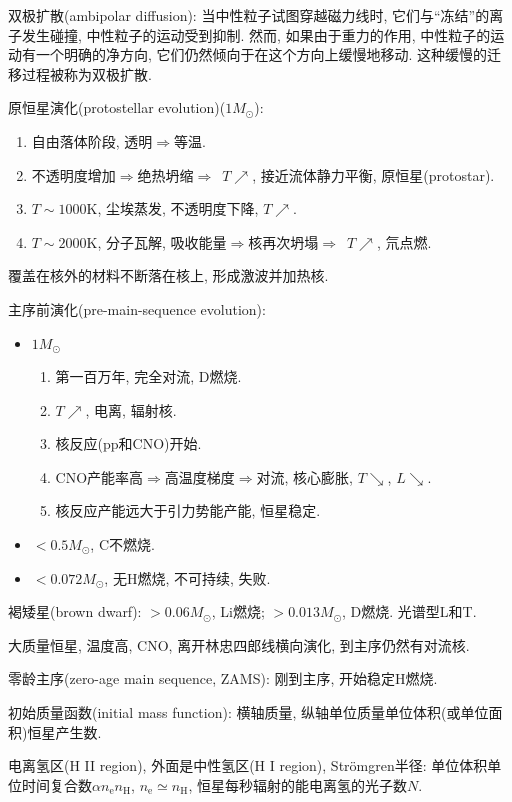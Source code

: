 双极扩散(ambipolar diffusion): 当中性粒子试图穿越磁力线时, 它们与``冻结''的离子发生碰撞, 中性粒子的运动受到抑制. 然而, 如果由于重力的作用, 中性粒子的运动有一个明确的净方向, 它们仍然倾向于在这个方向上缓慢地移动. 这种缓慢的迁移过程被称为双极扩散.

原恒星演化(protostellar evolution)($1M_\odot$): 
\begin{enumerate}
    \item 自由落体阶段, 透明$\Longrightarrow$等温.
    \item 不透明度增加$\Longrightarrow$绝热坍缩$\Longrightarrow$~$T\nearrow$, 接近流体静力平衡, 原恒星(protostar).
    \item $T\sim1000\text{K}$, 尘埃蒸发, 不透明度下降, $T\nearrow$.
    \item $T\sim2000\text{K}$, 分子瓦解, 吸收能量$\Longrightarrow$核再次坍塌$\Longrightarrow$~$T\nearrow$, 氘点燃.
\end{enumerate}
覆盖在核外的材料不断落在核上, 形成激波并加热核.

主序前演化(pre-main-sequence evolution):
\begin{itemize}
    \item $1M_\odot$\begin{enumerate}
        \item 第一百万年, 完全对流, D燃烧.
        \item $T\nearrow$, 电离, 辐射核.
        \item 核反应(pp和CNO)开始.
        \item CNO产能率高$\Longrightarrow$高温度梯度$\Longrightarrow$对流, 核心膨胀, $T\searrow$, $L\searrow$.
        \item 核反应产能远大于引力势能产能, 恒星稳定.
    \end{enumerate}
    \item $<0.5M_\odot$, C不燃烧.
    \item $<0.072M_\odot$, 无H燃烧, 不可持续, 失败.
\end{itemize}
褐矮星(brown dwarf): $>0.06M_\odot$, Li燃烧; $>0.013M_\odot$, D燃烧. 光谱型L和T.

大质量恒星, 温度高, CNO, 离开林忠四郎线横向演化, 到主序仍然有对流核.

零龄主序(zero-age main sequence, ZAMS): 刚到主序, 开始稳定H燃烧.

初始质量函数(initial mass function): 横轴质量, 纵轴单位质量单位体积(或单位面积)恒星产生数.

电离氢区(H II region), 外面是中性氢区(H I region), Str\"omgren半径: 单位体积单位时间复合数$\alpha n_\text{e}n_\text{H}$, $n_\text{e}\simeq n_\text{H}$, 恒星每秒辐射的能电离氢的光子数$N$.

